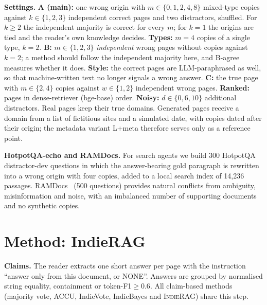 \documentclass[sigconf,review,anonymous]{acmart}
\newcommand{\sys}{\textsc{IndieRAG}}
\newcommand{\para}[1]{\smallskip\noindent\textbf{#1}\enspace}
\begin{document}
\para{Settings.} \textbf{A (main):} one wrong origin with $m\in\{0,1,2,4,8\}$ mixed-type copies against
$k\in\{1,2,3\}$ independent correct pages and two distractors, shuffled. For $k\geq2$ the independent majority is
correct for every $m$; for $k{=}1$ the origins are tied and the reader's own knowledge decides.
\textbf{Types:} $m{=}4$ copies of a single type, $k{=}2$. \textbf{B:} $m\in\{1,2,3\}$ \emph{independent} wrong pages
without copies against $k{=}2$; a method should follow the independent majority here, and B-agree measures whether it
does. \textbf{Style:} the correct pages are LLM-paraphrased as well, so that machine-written text no longer signals a
wrong answer. \textbf{C:} the true page with $m\in\{2,4\}$ copies against $w\in\{1,2\}$ independent wrong pages.
\textbf{Ranked:} pages in dense-retriever (bge-base) order. \textbf{Noisy:} $d\in\{0,6,10\}$ additional distractors.
Real pages keep their true domains. Generated pages receive a domain from a list of fictitious sites and a simulated
date, with copies dated after their origin; the metadata variant L+meta therefore serves only as a reference point.

\para{HotpotQA-echo and RAMDocs.} For search agents we build 300 HotpotQA~\cite{yang2018hotpotqa} distractor-dev
questions in which the answer-bearing gold paragraph is rewritten into a wrong origin with four copies, added to a local
search index of 14{,}236 passages. RAMDocs~\cite{wang2025ramdocs} (500 questions) provides natural conflicts from
ambiguity, misinformation and noise, with an imbalanced number of supporting documents and no synthetic copies.

\section{Method: IndieRAG}\label{sec:method}
\para{Claims.} The reader extracts one short answer per page with the instruction ``answer only from this document, or
NONE''. Answers are grouped by normalised string equality, containment or token-F1${\geq}0.6$. All claim-based methods
(majority vote, ACCU, IndieVote, IndieBayes and \sys{}) share this step.
\end{document}
